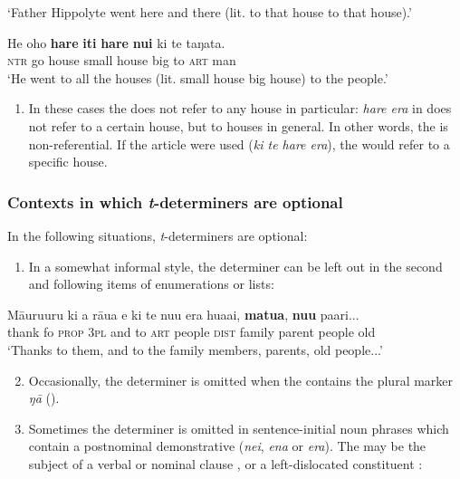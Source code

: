 \glt 
‘Father Hippolyte went here and there (lit. to that house to that house).’ \textstyleExampleref{[R231.282]} 
\z

\ea\label{ex:5.21}
\gll He oho \textbf{hare} \textbf{{\ꞌ}iti} \textbf{hare} \textbf{nui} ki te taŋata. \\
\textsc{ntr} go house small house big to \textsc{art} man \\

\glt
‘He went to all the houses (lit. small house big house) to the people.’ \textstyleExampleref{[R368.056]} 
\z

\begin{enumerate}
\item[]
In these cases the  does not refer to any house in particular: \textit{hare era} in  does not refer to a certain house, but to houses in general. In other words, the  is non-referential. If the article were used (\textit{ki te hare era}), the  would refer to a specific house.
\end{enumerate}

\subsubsection{Contexts in which \textit{t}{}-determiners are optional}\label{sec:5.3.2.3}

In the following situations, \textit{t}{}-determiners are optional:

\begin{enumerate}
\setcounter{enumi}{0}
\item
In a somewhat informal style, the determiner can be left out in the second and following items of enumerations or lists:
\end{enumerate}

\ea\label{ex:5.22}
\gll Māuruuru ki a rāua {\ꞌ}e ki te nu{\ꞌ}u era hua{\ꞌ}ai, \textbf{matu{\ꞌ}a}, \textbf{nu{\ꞌ}u} pa{\ꞌ}ari...\\
thank fo \textsc{prop} \textsc{3pl} and to \textsc{art} people \textsc{dist} family parent people old\\

\glt 
‘Thanks to them, and to the family members, parents, old people...’ \textstyleExampleref{[R202.004]} 
\z

\begin{enumerate}
\setcounter{enumi}{1}
\item
Occasionally, the determiner is omitted when the  contains the plural marker \textit{ŋā} ().

\item
Sometimes the determiner is omitted in sentence-initial noun phrases which contain a postnominal demonstrative (\textit{nei}, \textit{ena} or \textit{era}). The  may be the subject of a verbal  or nominal clause , or a left-dislocated constituent :
\end{enumerate}

